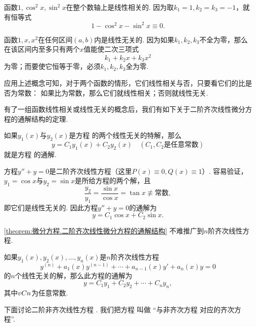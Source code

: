 \begin{example}
函数\(1,\cos^2 x, \sin^2 x\)在整个数轴上是线性相关的.
因为取\(k_1=1,k_2=k_3=-1\)，就有恒等式\[
1 - \cos^2 x - \sin^2 x \equiv 0.
\]

函数\(1,x,x^2\)在任何区间\((a,b)\)内是线性无关的.
因为如果\(k_1,k_2,k_3\)不全为零，那么在该区间内至多只有两个\(x\)值能使二次三项式\[
k_1 + k_2 x + k_3 x^2
\]为零；而要使它恒等于零，必须\(k_1,k_2,k_3\)全为零.
\end{example}

应用上述概念可知，对于两个函数的情形，它们线性相关与否，只要看它们的比是否为常数：
如果比为常数，那么它们就线性相关；否则就线性无关.

有了一组函数线性相关或线性无关的概念后，我们有如下关于二阶齐次线性微分方程的通解结构的定理.
\begin{theorem}\label{theorem:微分方程.二阶齐次线性微分方程的通解结构}
如果\(y_1(x)\)与\(y_2(x)\)是方程  的两个线性无关的特解，那么\[
y = C_1 y_1(x) + C_2 y_2(x) \quad(C_1,C_2\text{是任意常数})
\]就是方程  的通解.
\end{theorem}

\begin{example}
方程\(y'' + y = 0\)是二阶齐次线性方程（这里\(P(x)\equiv0, Q(x)\equiv1\)）.
容易验证，\(y_1 = \cos x\)与\(y_2 = \sin x\)是所给方程的两个解，且\[
\frac{y_2}{y_1} = \frac{\sin x}{\cos x} = \tan x \not\equiv\text{常数},
\]即它们是线性无关的.
因此方程\(y'' + y = 0\)的通解为\[
y = C_1 \cos x + C_2 \sin x.
\]
\end{example}

\cref{theorem:微分方程.二阶齐次线性微分方程的通解结构} 不难推广到\(n\)阶齐次线性方程.
\begin{corollary}\label{theorem:微分方程.n阶齐次线性微分方程的通解结构}
如果\(y_1(x),y_2(x),\dotsc,y_n(x)\)是\(n\)阶齐次线性方程\[
y^{(n)} + a_1(x) y^{(n-1)} + \dotsb + a_{n-1}(x) y' + a_n(x) y = 0
\]的\(n\)个线性无关的解，那么此方程的通解为\[
y = C_1 y_1 + C_2 y_2 + \dotsb + C_n y_n,
\]其中\(v{C}{n}\)为任意常数.
\end{corollary}

下面讨论二阶非齐次线性方程 .
我们把方程  叫做%
“与非齐次方程  对应的齐次方程”.


